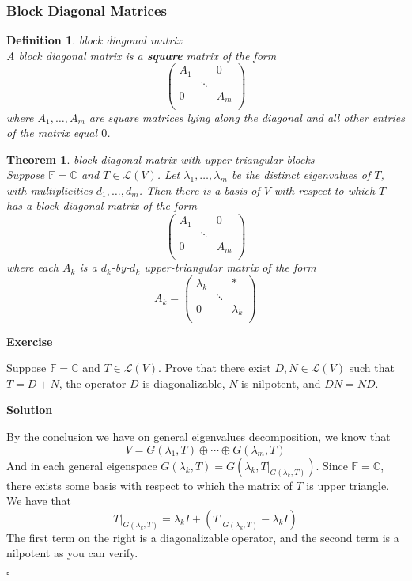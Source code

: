 \documentclass{article}
\newtheorem{theorem}{Theorem}[subsection]
\newtheorem{definition}{Definition}[subsection]
\newenvironment{exercise}{%
{\textbf{Exercise\\}
    }
}{
}
\newenvironment{solution}{%
{
    \textbf{Solution\\}
    }
}{
  \hfill $\square$ 
  \par\bigskip 
}
\newcommand{\CC}{\mathbb{C}}
\newcommand{\FF}{\mathbb{F}}
\begin{document}
\begin{CJK}{UTF8}{gkai}
\subsubsection{Block Diagonal Matrices}

\begin{definition}
    block diagonal matrix\\

    A block diagonal matrix is a \textbf{square} matrix of the form
    \[\begin{pmatrix}
        A_1&&0\\
        &\ddots&\\
        0&&A_m\\
    \end{pmatrix}\]
    where $A_1,\ldots,A_m$ are square matrices lying along the diagonal and all other entries of the matrix equal $0$.
\end{definition}

\begin{theorem}
    block diagonal matrix with upper-triangular blocks\\
    Suppose $\FF=\CC$ and $T\in\mathcal{L}(V)$. Let $\lambda_1,\ldots,\lambda_m$ be the distinct eigenvalues
    of $T$, with multiplicities $d_1,\ldots,d_m$. Then there is a basis of $V$ with respect to which $T$ has a block diagonal matrix of the form
    \[\begin{pmatrix}
        A_1&&0\\
        &\ddots&\\
        0&&A_m\\
    \end{pmatrix}\]
    where each $A_k$ is a $d_k$-by-$d_k $ upper-triangular matrix of the form
    \[A_k = \begin{pmatrix}
        \lambda_k&&\ast\\
        &\ddots&\\
        0&&\lambda_k\\
    \end{pmatrix}\]
\end{theorem}

\begin{exercise}
    Suppose $\FF = \CC$ and $T \in \mathcal{L}(V)$. Prove that there exist $D,N \in \mathcal{L}(V)$ such that $T = D+N$, the operator $D$ is diagonalizable, $N$ is nilpotent, and $DN =ND$.
\end{exercise}

\begin{solution}
    By the conclusion we have on general eigenvalues decomposition, we know that 
    \[V = G(\lambda_1,T)\oplus\cdots\oplus G(\lambda_m,T)\]
    And in each general eigenspace $G(\lambda_k,T) = G(\lambda_k,T|_{G(\lambda_k,T)})$.
    Since $\FF = \CC$, there exists some basis with respect to which the matrix of $T$ is upper triangle. We have that 
    \[T|_{G(\lambda_k,T)} = \lambda_k I + (T|_{G(\lambda_k,T)} - \lambda_k I)\] 
    The first term on the right is a diagonalizable operator, and the second term is a nilpotent as you can verify.
    

\end{solution}
\end{CJK}
\end{document}
